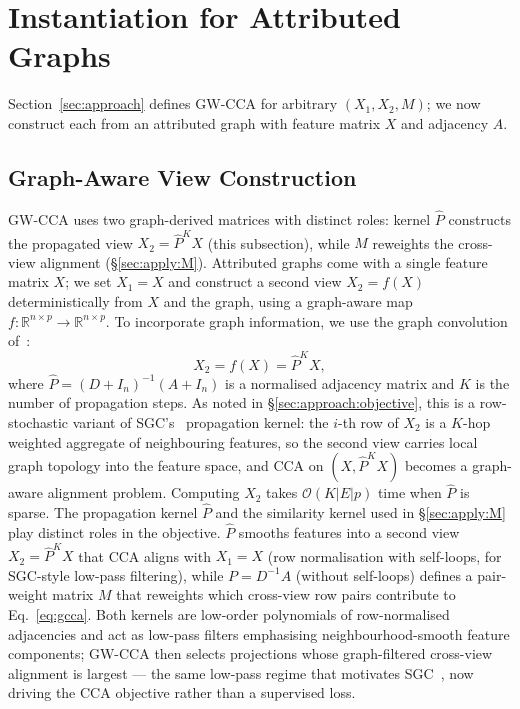 \documentclass{article}
\begin{document}
\section{Instantiation for Attributed Graphs}
\label{sec:apply}

Section~\ref{sec:approach} defines GW-CCA for arbitrary $(X_1, X_2, M)$;
we now construct each from an attributed graph with feature matrix $X$
and adjacency $A$.

\subsection{Graph-Aware View Construction}
GW-CCA uses two graph-derived matrices with distinct
roles: kernel $\widehat{P}$ constructs the propagated view
$X_2 = \widehat{P}^K X$ (this subsection), while $M$ reweights the
cross-view alignment (\S\ref{sec:apply:M}). Attributed graphs come
with a single feature matrix $X$; we set $X_1 = X$
and construct a second view $X_2 = f(X)$ deterministically from $X$ and the
graph, using a graph-aware map
$f : \mathbb{R}^{n \times p} \rightarrow \mathbb{R}^{n \times p}$. To
incorporate graph information, we use the graph convolution
of~\citet{wu2019simplifying}:
\begin{equation}\label{eq:f}
X_2 = f(X) = \widehat{P}^K X,
\end{equation}
where $\widehat{P} = (D + I_n)^{-1}(A + I_n)$ is a normalised adjacency matrix and
$K$ is the number of propagation steps. As noted in
\S\ref{sec:approach:objective}, this is a row-stochastic variant of
SGC's~\citep{wu2019simplifying} propagation kernel: the $i$-th row of
$X_2$ is a $K$-hop weighted aggregate
of neighbouring features, so the second view carries local graph topology
into the feature space, and CCA on $(X, \widehat{P}^K X)$ becomes a
graph-aware alignment problem. Computing $X_2$ takes $\mathcal{O}(K|E|p)$
time when $\widehat{P}$ is sparse. The propagation kernel $\widehat{P}$
and the similarity kernel used in \S\ref{sec:apply:M} play distinct
roles in the objective. $\widehat{P}$ smooths features into a second
view $X_2 = \widehat{P}^K X$ that CCA aligns with $X_1 = X$ (row
normalisation with self-loops, for SGC-style low-pass filtering), while
$P = D^{-1}A$ (without self-loops) defines a pair-weight matrix $M$
that reweights which cross-view row pairs contribute to
Eq.~\ref{eq:gcca}. Both kernels are low-order polynomials of
row-normalised adjacencies and act as low-pass filters emphasising
neighbourhood-smooth feature components; GW-CCA then selects
projections whose graph-filtered cross-view alignment is largest ---
the same low-pass regime that motivates
SGC~\citep{wu2019simplifying}, now driving the CCA objective rather
than a supervised loss.
\end{document}
